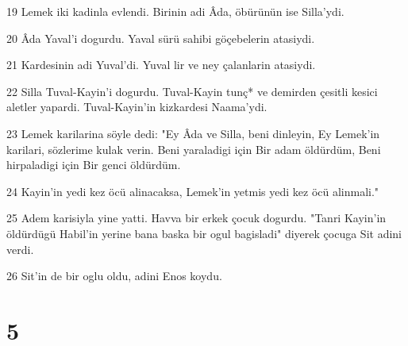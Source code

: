 \par 19 Lemek iki kadinla evlendi. Birinin adi Âda, öbürünün ise Silla'ydi.
\par 20 Âda Yaval'i dogurdu. Yaval sürü sahibi göçebelerin atasiydi.
\par 21 Kardesinin adi Yuval'di. Yuval lir ve ney çalanlarin atasiydi.
\par 22 Silla Tuval-Kayin'i dogurdu. Tuval-Kayin tunç* ve demirden çesitli kesici aletler yapardi. Tuval-Kayin'in kizkardesi Naama'ydi.
\par 23 Lemek karilarina söyle dedi: "Ey Âda ve Silla, beni dinleyin, Ey Lemek'in karilari, sözlerime kulak verin. Beni yaraladigi için Bir adam öldürdüm, Beni hirpaladigi için Bir genci öldürdüm.
\par 24 Kayin'in yedi kez öcü alinacaksa, Lemek'in yetmis yedi kez öcü alinmali."
\par 25 Adem karisiyla yine yatti. Havva bir erkek çocuk dogurdu. "Tanri Kayin'in öldürdügü Habil'in yerine bana baska bir ogul bagisladi" diyerek çocuga Sit adini verdi.
\par 26 Sit'in de bir oglu oldu, adini Enos koydu.

\chapter{5}

